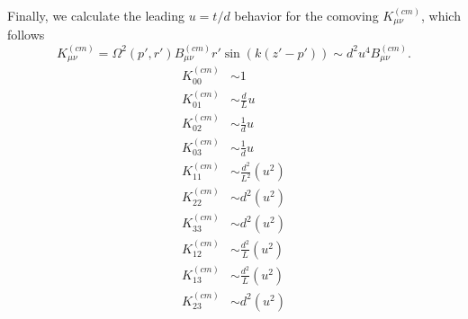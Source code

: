 \documentclass[10pt,letterpaper]{article}
\begin{document}
Finally, we calculate the leading $u= t/d$ behavior for the comoving $K_{\mu\nu}^{(cm)}$, which follows
\begin{equation}
K^{(cm)}_{\mu\nu} = \Omega^2(p',r')  B_{\mu\nu}^{(cm)} r' \sin(k(z'-p')) \sim d^2 u^4 B_{\mu\nu}^{(cm)}.
\end{equation}
\begin{align}
K^{(cm)}_{00} &\sim 1 \nonumber\\
K^{(cm)}_{01} &\sim \frac{d}{L}u \nonumber\\
K^{(cm)}_{02} &\sim \frac{1}{d}u \nonumber\\
K^{(cm)}_{03} &\sim \frac{1}{d}u \nonumber\\
K^{(cm)}_{11} &\sim \frac{d^2}{L^2}(u^2) \nonumber\\
K^{(cm)}_{22} &\sim d^2(u^2) \nonumber\\
K^{(cm)}_{33} &\sim d^2(u^2) \nonumber\\
K^{(cm)}_{12} &\sim \frac{d^2}{L}(u^2) \nonumber\\
K^{(cm)}_{13} &\sim \frac{d^2}{L}(u^2) \nonumber\\
K^{(cm)}_{23} &\sim d^2(u^2)
\end{align}
\end{document}
